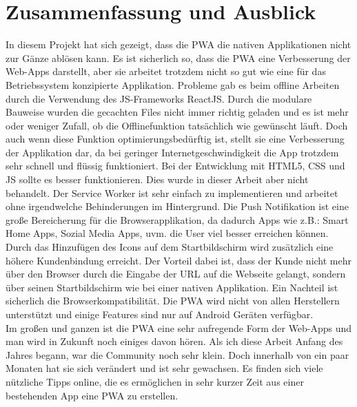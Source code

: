 \chapter{Zusammenfassung und Ausblick}
\thispagestyle{standard}
\pagestyle{standard}
\renewcommand{\footrulewidth}{0.4pt}

In diesem Projekt hat sich gezeigt, dass die \acs{PWA} die nativen Applikationen nicht zur Gänze ablösen kann. Es ist sicherlich so, dass die \acs{PWA} eine Verbesserung der \acs{Web-App}s darstellt, aber sie arbeitet trotzdem nicht so gut wie eine für das Betriebssystem konzipierte Applikation.
Probleme gab es beim offline Arbeiten durch die Verwendung des \acs{JS}-Frameworks ReactJS. Durch die modulare Bauweise wurden die gecachten Files nicht immer richtig geladen und es ist mehr oder weniger Zufall, ob die Offlinefunktion tatsächlich wie gewünscht läuft. Doch auch wenn diese Funktion optimierungsbedürftig ist, stellt sie eine Verbesserung der Applikation dar, da bei geringer Internetgeschwindigkeit die App trotzdem sehr schnell und flüssig funktioniert. Bei der Entwicklung mit \acs{HTML}5, \acs{CSS} und \acs{JS} sollte es besser funktionieren. Dies wurde in dieser Arbeit aber nicht behandelt. 
Der Service Worker ist sehr einfach zu implementieren und arbeitet ohne irgendwelche Behinderungen im Hintergrund.
Die Push Notifikation ist eine große Bereicherung für die Browserapplikation, da dadurch Apps wie z.B.: Smart Home Apps, Sozial Media Apps, uvm. die User viel besser erreichen können. Durch das Hinzufügen des Icons auf dem Startbildschirm wird zusätzlich eine höhere Kundenbindung erreicht. Der Vorteil dabei ist, dass der Kunde nicht mehr über den Browser durch die Eingabe der URL auf die Webseite gelangt, sondern über seinen Startbildschirm wie bei einer nativen Applikation. Ein Nachteil ist sicherlich die Browserkompatibilität. Die \acs{PWA} wird nicht von allen Herstellern unterstützt und einige Features sind nur auf Android Geräten verfügbar. 
\\Im großen und ganzen ist die \acs{PWA} eine sehr aufregende Form der \acs{Web-App}s und man wird in Zukunft noch einiges davon hören.
Als ich diese Arbeit Anfang des Jahres begann, war die Community noch sehr klein. Doch innerhalb von ein paar Monaten hat sie sich verändert und ist sehr gewachsen. Es finden sich viele nützliche Tipps online, die es ermöglichen in sehr kurzer Zeit aus einer bestehenden App eine \acs{PWA} zu erstellen. 